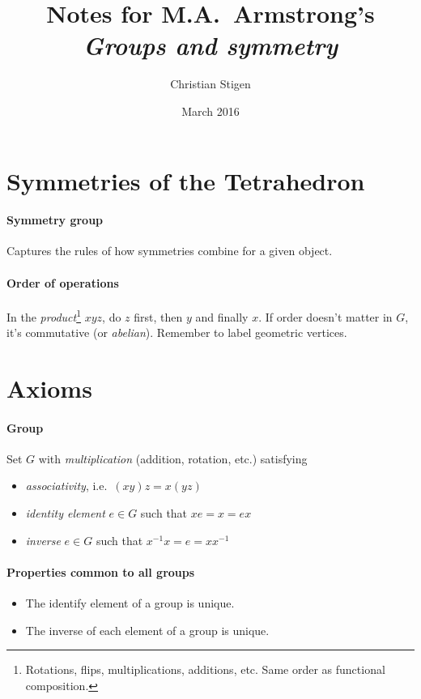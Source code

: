 \documentclass[a4paper,twocolumn,10pt]{article}
\title{Notes for M.A.~Armstrong's \textit{Groups and symmetry}}
\author{Christian Stigen}
\date{March 2016}
\begin{document}
  \maketitle
  \section{Symmetries of the Tetrahedron}
  \paragraph{Symmetry group} Captures the rules of how symmetries combine for a
  given object.

  \paragraph{Order of operations} In the \textit{product}\footnote{Rotations,
  flips, multiplications, additions, etc. Same order as functional
  composition.} $xyz$, do $z$ first, then $y$ and finally $x$. If order doesn't
  matter in $G$, it's commutative (or \textit{abelian}). Remember to label
  geometric vertices.

  \section{Axioms}
  \paragraph{Group}  Set $G$ with \textit{multiplication} (addition,
  rotation, etc.) satisfying
  \begin{itemize}
    \item \textit{associativity}, i.e.~$(xy)z = x(yz)$
    \item \textit{identity element} $e \in G$ such that $xe=x=ex$
    \item \textit{inverse} $e \in G$ such that $x^{-1}x=e=xx^{-1}$
  \end{itemize}

  \paragraph{Properties common to all groups}
  \begin{itemize}
    \item The identify element of a group is unique.
    \item The inverse of each element of a group is unique.
  \end{itemize}
\end{document}
